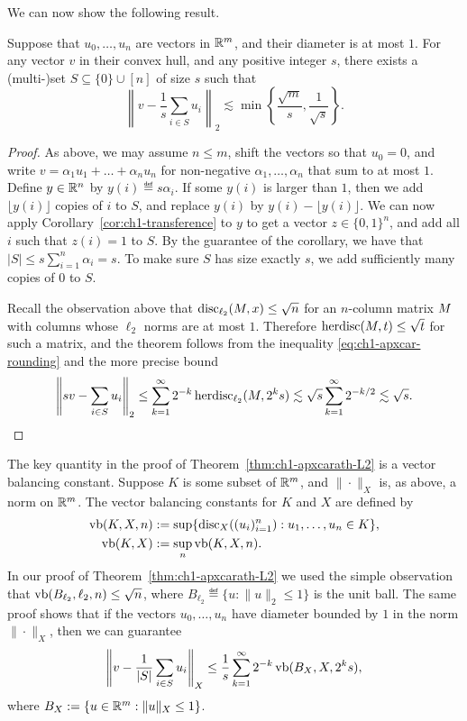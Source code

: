 We can now show the following result.
\begin{theorem}\label{thm:ch1-apxcarath-L2}
    Suppose that $u_0, \ldots, u_n$ are vectors in $\mathbb{R}^m$, and their diameter is at most $1$. For any vector $v$ in their convex hull, and any positive integer $s$, there exists a (multi-)set $S \subseteq \{0\} \cup [n]$ of size $s$ such that 
    \[
    \left\|v - \frac{1}{s} \sum_{i \in S} u_i\right\|_2 \lesssim \min\left\{\frac{\sqrt{m}}{s}, \frac{1}{\sqrt{s}}\right\}.
    \]
\end{theorem}
\begin{proof}
    As above, we may assume $n \le m$, shift the vectors so that $u_0 = 0$, and write $v = \alpha_1 u_1 + \ldots + \alpha_n u_n$ for non-negative $\alpha_1, \ldots, \alpha_n$ that sum to at most $1$. Define $y \in \mathbb{R}^n$ by $y(i) \eqdef s \alpha_i$. If some $y(i)$ is larger than $1$, then we add $\lfloor y(i)\rfloor$ copies of $i$ to $S$, and replace $y(i)$ by $y(i) - \lfloor y(i)\rfloor$. We can now apply Corollary~\ref{cor:ch1-transference} to $y$ to get a vector $z \in \{0,1\}^n$, and add all $i$ such that $z(i) = 1$ to $S$. By the guarantee of the corollary, we have that $|S| \le s\sum_{i=1}^n\alpha_i = s$. To make sure $S$ has size exactly $s$, we add sufficiently many copies of $0$ to $S$. 
    
    Recall the observation above that $\operatorname{disc}_{\ell_2}(M,x) \le \sqrt{n}$ for an $n$-column matrix $M$ with columns whose $\ell_2$ norms are at most $1$. Therefore $\operatorname{herdisc}(M,t) \le \sqrt{t}$ for such a matrix, and the theorem follows from the inequality \eqref{eq:ch1-apxcar-rounding} and the more precise bound
    \[
    \left\|sv - \sum_{i\in S} u_i\right\|_2 \le \sum_{k=1}^\infty 2^{-k}\operatorname{herdisc}_{\ell_2}(M,2^ks)
    \lesssim \sqrt{s}\sum_{k=1}^\infty 2^{-k/2}\lesssim \sqrt{s}.
    \qedhere \]
\end{proof}

The key quantity in the proof of Theorem~\ref{thm:ch1-apxcarath-L2} is a vector balancing constant. Suppose $K$ is some subset of $\mathbb{R}^m$, and $\|\cdot\|_X$ is, as above, a norm on $\mathbb{R}^m$. The vector balancing constants for $K$ and $X$ are defined by
\begin{align*}
  \operatorname{vb}(K,X,n) &:= \sup\{\operatorname{disc}_X((u_i)_{i=1}^n): u_1, \ldots, u_n  \in K\},\\
  \operatorname{vb}(K,X) &:= \sup_n \operatorname{vb}(K,X,n). 
\end{align*}
In our proof of Theorem~\ref{thm:ch1-apxcarath-L2} we used the simple observation that $\operatorname{vb}(B_{\ell_2},\ell_2,n) \le\sqrt{n}$, where $B_{\ell_2} \eqdef \{u: \|u\|_2 \le 1\}$ is the unit ball. The same proof shows that if the vectors $u_0, \ldots, u_n$ have diameter bounded by $1$ in the norm $\|\cdot\|_X$, then we can guarantee
\[
    \left\|v - \frac{1}{|S|} \sum_{i \in S} u_i\right\|_X \le
    \frac{1}{s} \sum_{k = 1}^\infty 2^{-k}\operatorname{vb}(B_X, X, 2^{k}s),
\]
where $B_X := \{u \in \mathbb{R}^m: \|u\|_X \le 1\}$.

